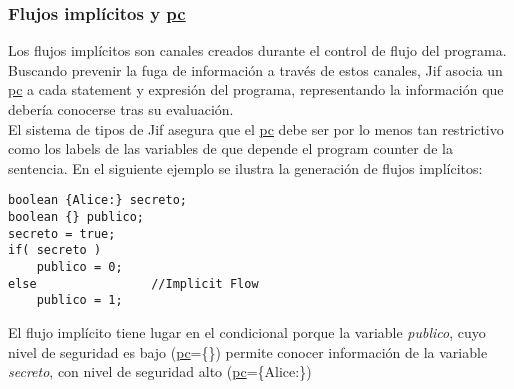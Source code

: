 \subsubsection{Flujos implícitos y \underline{pc}}
Los flujos implícitos son canales creados durante el control de flujo del
programa. Buscando prevenir la fuga de información a través de estos canales,
Jif asocia un \underline{pc} a cada statement y expresión del programa,
representando la información que debería conocerse tras su evaluación.\\
El sistema de tipos de Jif asegura que el \underline{pc} debe ser por
lo menos tan restrictivo como los labels de las variables de que depende el
program counter de la sentencia.\newline
En el siguiente ejemplo se ilustra la generación de flujos implícitos:
\begin{lstlisting}[basicstyle=\scriptsize]
boolean {Alice:} secreto;
boolean {} publico;
secreto = true;
if( secreto )		
	publico = 0;
else				//Implicit Flow
	publico = 1;
\end{lstlisting}
El flujo implícito tiene lugar en el condicional porque la variable
\emph{publico}, cuyo nivel de seguridad es bajo (\underline{pc}=\{\}) permite
conocer información de la variable \emph{secreto}, con nivel de seguridad alto
(\underline{pc}=\{Alice:\})\newline
